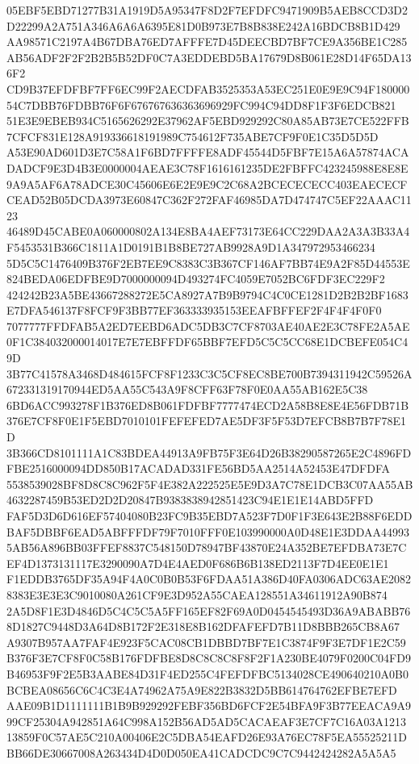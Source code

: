 \documentclass[UTF8,fontset=fandol,zihao=-4,a4paper]{ctexart}
\begin{document}
{{05EBF5EBD71277B31A1919D5A95347F8D2F7EFDFC9471909B5AEB8CCD3D2D22299A2A751A346A6A6A6395E81D0B973E7B8B838E242A16BDCB8B1D429
AA98571C2197A4B67DBA76ED7AFFFE7D45DEECBD7BF7CE9A356BE1C285AB56ADF2F2F2B2B5B52DF0C7A3EDDEBD5BA17679D8B061E28D14F65DA136F2
CD9B37EFDFBF7FF6EC99F2AECDFAB3525353A53EC251E0E9E9C94F18000054C7DBB76FDBB76F6F676767636363696929FC994C94DD8F1F3F6EDCB821
51E3E9EBEB934C5165626292E37962AF5EBD929292C80A85AB73E7CE522FFB7CFCF831E128A919336618191989C754612F735ABE7CF9F0E1C35D5D5D
A53E90AD601D3E7C58A1F6BD7FFFFE8ADF45544D5FBF7E15A6A57874ACADADCF9E3D4B3E0000004AEAE3C78F1616161235DE2FBFFC423245988E8E8E
9A9A5AF6A78ADCE30C45606E6E2E9E9C2C68A2BCECECECC403EAECECFCEAD52B05DCDA3973E60847C362F272FAF46985DA7D474747C5EF22AAAC1123
46489D45CABE0A060000802A134E8BA4AEF73173E64CC229DAA2A3A3B33A4F5453531B366C1811A1D0191B1B8BE727AB9928A9D1A347972953466234
5D5C5C1476409B376F2EB7EE9C8383C3B367CF146AF7BB74E9A2F85D44553E824BEDA06EDFBE9D7000000094D493274FC4059E7052BC6FDF3EC229F2
424242B23A5BE43667288272E5CA8927A7B9B9794C4C0CE1281D2B2B2BF1683E7DFA546137F8FCF9F3BB77EF363333935153EEAFBFFEF2F4F4F4F0F0
7077777FFDFAB5A2ED7EEBD6ADC5DB3C7CF8703AE40AE2E3C78FE2A5AE0F1C384032000014017E7E7EBFFDF65BBF7EFD5C5C5CC68E1DCBEFE054C49D
3B77C41578A3468D484615FCF8F1233C3C5CF8EC8BE700B7394311942C59526A672331319170944ED5AA55C543A9F8CFF63F78F0E0AA55AB162E5C38
6BD6ACC993278F1B376ED8B061FDFBF7777474ECD2A58B8E8E4E56FDB71B376E7CF8F0E1F5EBD7010101FEFEFED7AE5DF3F5F53D7EFCB8B7B7F78E1D
3B366CD8101111A1C83BDEA44913A9FB75F3E64D26B38290587265E2C4896FDFBE2516000094DD850B17ACADAD331FE56BD5AA2514A52453E47DFDFA
5538539028BF8D8C8C962F5F4E382A222525E5E9D3A7C78E1DCB3C07AA55AB4632287459B53ED2D2D20847B9383838942851423C94E1E1E14ABD5FFD
FAF5D3D6D616EF57404080B23FC9B35EBD7A523F7D0F1F3E643E2B88F6EDDBAF5DBBF6EAD5ABFFFDF79F7010FFF0E103990000A0D48E1E3DDAA44993
5AB56A896BB03FFEF8837C548150D78947BF43870E24A352BE7EFDBA73E7CEF4D1373131117E3290090A7D4E4AED0F686B6B138ED2113F7D4EE0E1E1
F1EDDB3765DF35A94F4A0C0B0B53F6FDAA51A386D40FA0306ADC63AE20828383E3E3E3C9010080A261CF9E3D952A55CAEA128551A34611912A90B874
2A5D8F1E3D4846D5C4C5C5A5FF165EF82F69A0D0454545493D36A9ABABB768D1827C9448D3A64D8B172F2E318E8B162DFAFEFD7B11D8BBB265CB8A67
A9307B957AA7FAF4E923F5CAC08CB1DBBD7BF7E1C3874F9F3E7DF1E2C59B376F3E7CF8F0C58B176FDFBE8D8C8C8C8F8F2F1A230BE4079F0200C04FD9
B46953F9F2E5B3AABE84D31F4ED255C4FEFDFBC5134028CE490640210A0B0BCBEA08656C6C4C3E4A74962A75A9E822B3832D5BB614764762EFBE7EFD
AAE09B1D1111111B1B9B929292FEBF356BD6FCF2E54BFA9F3B77EEACA9A999CF25304A942851A64C998A152B56AD5AD5CACAEAF3E7CF7C16A03A1213
13859F0C57AE5C210A00406E2C5DBA54EAFD26E93A76EC78F5EA55525211DBB66DE30667008A263434D4D0D050EA41CADCDC9C7C9442424282A5A5A5
}}
\end{document}

